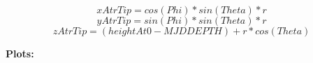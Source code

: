 \documentclass[a4paper,12pt]{article}
\begin{document}
$$xAtrTip=cos(Phi) * sin(Theta) * r$$
$$yAtrTip=sin(Phi) * sin(Theta) * r$$
$$zAtrTip=(heightAt0 - MJDDEPTH) + r*cos(Theta)$$

\begin{figure}[H]
\centering
{}%
\end{figure}

\begin{figure}[H]
\centering
{}%
\end{figure}

\pagebreak
\textbf{Plots:} \\

\begin{figure}[H]
\centering
{}%
\end{figure}
\end{document}

